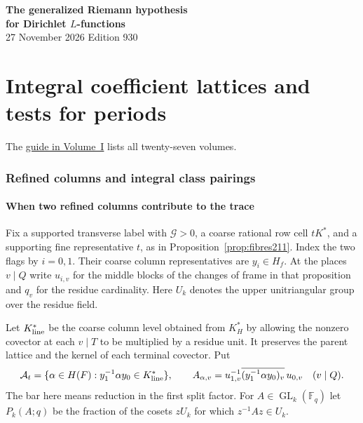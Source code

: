 \documentclass[a4paper,11pt]{article}
\theoremstyle{definition}
\theoremstyle{remark}
\numberwithin{equation}{section}
\newcommand{\GL}{\operatorname{GL}}
\begin{document}
\setcounter{part}{22}
\thispagestyle{plain}\begin{center}
{\LARGE\bfseries The generalized Riemann hypothesis\\[2pt]for Dirichlet \(L\)-functions}\\[6pt]
{\small 27 November 2026 \quad\textperiodcentered\quad Edition 930}\end{center}
\part{Integral coefficient lattices and tests for periods}\label{part:XXIII}
\begin{abstract}\noindent We construct integral tests for the projected period. Branching between Weyl lattices and elementary divisors of the coefficient tables control the finite projections on the marked rows.\end{abstract}
\setcounter{section}{118}
\noindent The \hyperref[seriesguide]{guide in Volume~I} lists all twenty-seven volumes.
\begingroup\small\setlength{\parskip}{0pt}\tableofcontents\endgroup
\clearpage

\section{Refined columns and integral class pairings}\label{nav:chapter-refined-rational-columns}\label{nav:volume-XXIII}
\subsection{When two refined columns contribute to the trace}\label{nav:IX-59}
Fix a supported transverse label with \(\mathcal G>0\), a
coarse rational row cell \(tK^*\), and a supporting fine
representative \(t\), as in Proposition~\ref{prop:fibres211}.
Index the two flags by \(i=0,1\). Their coarse column
representatives are \(y_i\in H_f\). At the places \(v\mid Q\)
write \(u_{i,v}\) for the middle blocks of the changes of
frame in that proposition and \(q_v\) for the residue
cardinality. Here \(U_k\) denotes the upper unitriangular
group over the residue field.

Let \(K_{\rm line}^*\) be the coarse column level obtained
from \(K_H^*\) by allowing the nonzero covector at each
\(v\mid T\) to be multiplied by a residue unit. It preserves
the parent lattice and the kernel of each terminal covector.
Put
\[
 {\cal A}_t=\{\alpha\in H(F):y_1^{-1}\alpha y_0\in K_{\rm line}^*\},
 \qquad A_{\alpha,v}=u_{1,v}^{-1}
       \overline{(y_1^{-1}\alpha y_0)_v}\,u_{0,v}\quad(v\mid Q).
\]
The bar here means reduction in the first split factor.
For \(A\in\GL_k(\mathbb F_q)\) let \(P_k(A;q)\) be the fraction
of the cosets \(zU_k\) for which \(z^{-1}Az\in U_k\).
\end{document}
